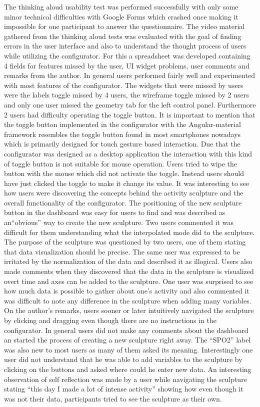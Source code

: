 \documentclass[../medieninformatik-arbeit.tex]{subfiles}
\begin{document}
The thinking aloud usability test was performed successfully with only some minor technical difficulties with Google Forms which crashed once making it impossible for one participant to answer the questionnaire. The video material gathered from the thinking aloud tests was evaluated with the goal of finding errors in the user interface and also to understand the thought process of users while utilizing the configurator. For this a spreadsheet was developed containing 4 fields for features missed by the user, UI widget problems, user comments and remarks from the author. In general users performed fairly well and experimented with most features of the configurator. The widgets that were missed by users were the labels toggle missed by 4 users, the wireframe toggle missed by 2 users and only one user missed the geometry tab for the left control panel. Furthermore 2 users had difficulty operating the toggle button. It is important to mention that the toggle button implemented in the configurator with the Angular-material framework resembles the toggle button found in most smartphones nowadays which is primarily designed for touch gesture based interaction. Due that the configurator was designed as a desktop application the interaction with this kind of toggle button is not suitable for mouse operation. Users tried to wipe the button with the mouse which did not activate the toggle. Instead users should have just clicked the toggle to make it change its value. It was interesting to see how users were discovering the concepts behind the activity sculpture and the overall functionality of the configurator. The positioning of the new sculpture button in the dashboard was easy for users to find and was described as an``obvious'' way to create the new sculpture. Two users commented it was difficult for them understanding what the interpolated mode did to the sculpture. The purpose of the sculpture was questioned by two users, one of them stating that data visualization should be precise. The same user was expressed to be irritated by the normalization of the data and described it as illogical. Users also made comments when they discovered that the data in the sculpture is visualized overt time and axes can be added to the sculpture. One user was surprised to see how much data is possible to gather about one's activity and also commented it was difficult to note any difference in the sculpture when adding many variables. On the author's remarks, users sooner or later intuitively navigated the sculpture by clicking and dragging even though there are no instructions in the configurator. In general users did not make any comments about the dashboard an started the process of creating a new sculpture right away. The ``SPO2'' label was also new to most users as many of them asked its meaning. Interestingly one user did not understand that he was able to add variables to the sculpture by clicking on the buttons and asked where could he enter new data. An interesting observation of self reflection was made by a user while navigating the sculpture stating ``this day I made a lot of intense activity'' showing how even though it was not their data, participants tried to see the sculpture as their own. 
\end{document}
